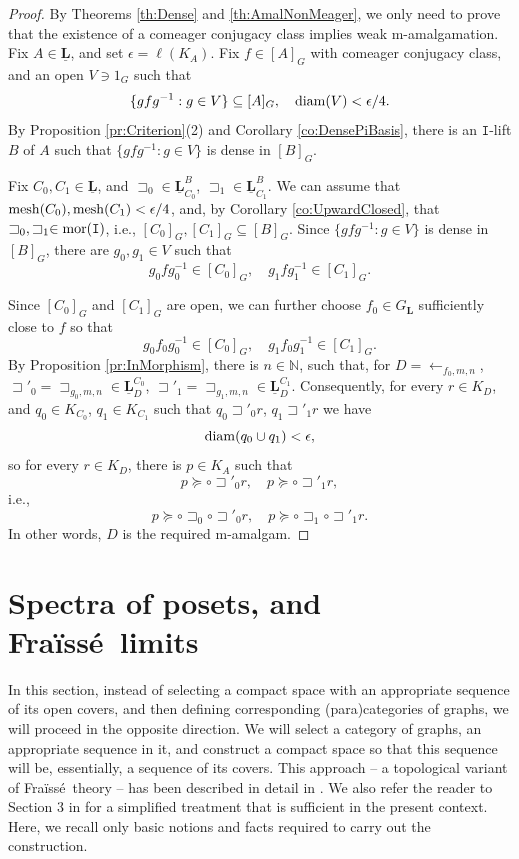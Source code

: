 \documentclass[12pt]{amsart}
\numberwithin{equation}{section}
\theoremstyle{plain}
\theoremstyle{definition}
\newcommand \mesh{{\rm{ mesh}}}
\newcommand \sqsp{\sqsupset}
\newcommand \la{\leftarrow}
\newcommand \mor{{\rm{mor}}}
\newcommand \diam{{\rm{ diam}}}
\newcommand \fra{Fra\"{i}ss\'{e}}
\newcommand \LLb{\mathbf{L}}
\newcommand \LLub{\underline{\mathbf{L}}}
\newcommand \NN{\mathbb{N}}
\newcommand \It{\mathtt{I}}
\begin{document}
\begin{proof}
By Theorems \ref{th:Dense} and \ref{th:AmalNonMeager}, we only need to prove that the existence of a comeager conjugacy class implies weak m-amalgamation. %
Fix $A \in \LLub$, and  set $\epsilon=\ell(K_A)$. Fix $f \in [A]_G$ with comeager conjugacy class, and an open $V \ni 1_G$ such that $$\{gfg^{-1}: g \in V \} \subseteq [A]_G, \quad \diam(V)<\epsilon/4.$$ By Proposition \ref{pr:Criterion}(2) and Corollary \ref{co:DensePiBasis}, there is an $\It$-lift $B$ of $A$ such that $\{gfg^{-1}: g \in V \}$ is dense in $[B]_G$. 
 
 Fix $C_0,C_1 \in \LLub$, and $\sqsp_0 \in \LLub^B_{C_0}$, $\sqsp_1 \in \LLub^B_{C_1}$. We can assume that $\mesh(C_0), \mesh(C_1)< \epsilon/4$, and, by Corollary  \ref{co:UpwardClosed}, that $\sqsp_0, \sqsp_1  \in \mor(\It) $, i.e., $[C_0]_G, [C_1]_G \subseteq [B]_G$. Since $\{gfg^{-1}:g \in V\}$ is dense in $[B]_G$, there are $g_0, g_1 \in V$ such that $$g_0fg^{-1}_0 \in [C_0]_G, \quad g_1fg^{-1}_1 \in [C_1]_G.$$ 
 
Since $[C_0]_G$ and $[C_1]_G$ are open, we can further choose $f_0\in G_{\LLb}$ sufficiently close to $f$ so that
 \[
 g_0f_0g_0^{-1}\in[C_0]_G,\quad
 g_1f_0g_1^{-1}\in[C_1]_G.
 \]
 By Proposition \ref{pr:InMorphism}, there is $n \in \NN$, such that, for $D=\la_{f_0,m,n}$, $\sqsp'_0=\sqsp_{g_0,m,n} \in \LLub^{C_0}_D$, $\sqsp'_1=\sqsp_{g_1,m,n} \in \LLub^{C_1}_D$. %
Consequently, for every $r  \in K_D$, and $q_0 \in K_{C_0}$, $q_1 \in K_{C_1}$ such that 
$q_0 \sqsp'_0 r$, $q_1 \sqsp'_1 r$ we have
 $$\diam(q_0 \cup q_1)<\epsilon,$$ so for every $r \in K_D$, there is $p \in K_A$ such that $$p \succeq \circ \sqsp'_0 r, \quad p \succeq \circ \sqsp'_1 r,$$ i.e., $$p \succeq \circ \sqsp_0 \circ \sqsp'_0 r, \quad p \succeq \circ \sqsp_1 \circ \sqsp'_1 r.$$ In other words, $D$ is the required m-amalgam.
\end{proof}

\section{Spectra of posets, and \fra \ limits}
In this section, instead of selecting a compact space with an appropriate sequence of its open covers, and then defining corresponding (para)categories of graphs, we will proceed in the opposite direction. We will select a category of graphs, an appropriate sequence in it, and construct a compact space so that this sequence will be, essentially, a sequence of its covers. This approach -- a topological variant of \fra \ theory -- has been described in detail in \cite{BaBiVi2}. We also refer the reader to Section 3 in \cite{Ma} for a simplified treatment that is sufficient in the present context. Here, we recall only basic notions and facts required to carry out the construction.
\end{document}
